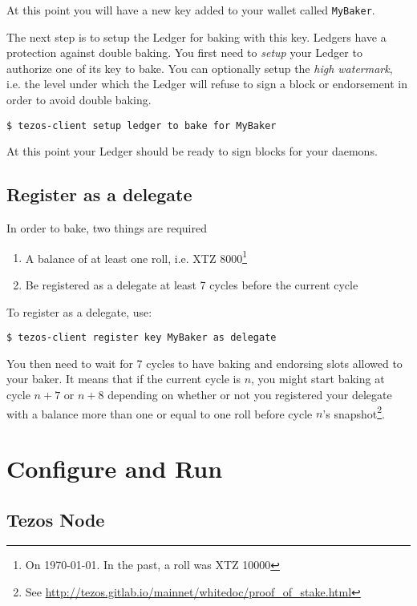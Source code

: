 \documentclass[a4paper,twocolumn,10pt]{article}
\begin{document}
At this point you will have a new key added to your wallet called
\texttt{MyBaker}.

The next step is to setup the Ledger for baking with this key. Ledgers
have a protection against double baking. You first need to
\emph{setup} your Ledger to authorize one of its key to bake. You can
optionally setup the \emph{high watermark}, i.e. the level under which
the Ledger will refuse to sign a block or endorsement in order to
avoid double baking.

\lstinline[style=BashInputStyle]'$ tezos-client setup ledger to bake for MyBaker'

At this point your Ledger should be ready to sign blocks for your
daemons.

\subsection{Register as a delegate}

In order to bake, two things are required

\begin{footnotesize}
\begin{enumerate}
\item A balance of at least one roll, i.e. XTZ 8000\footnote{On
  \today. In the past, a roll was XTZ 10000}
\item Be registered as a delegate at least 7 cycles before the current cycle
\end{enumerate}
\end{footnotesize}

To register as a delegate, use:

\lstinline[style=BashInputStyle]'$ tezos-client register key MyBaker as delegate'

You then need to wait for 7 cycles to have baking and endorsing slots
allowed to your baker. It means that if the current cycle is $n$, you
might start baking at cycle $n+7$ or $n+8$ depending on whether or not
you registered your delegate with a balance more than one or equal to
one roll before cycle $n$'s snapshot\footnote{See
  \url{http://tezos.gitlab.io/mainnet/whitedoc/proof_of_stake.html}}.

\section{Configure and Run}

\subsection{Tezos Node}
\end{document}
